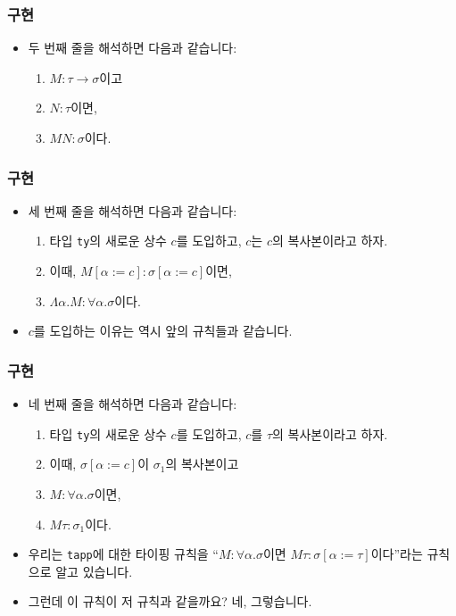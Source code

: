 \documentclass[slidestop,compress,mathserif]{beamer}
\begin{document}
    \begin{frame}
        \frametitle{구현}
        \begin{itemize}
            \item 두 번째 줄을 해석하면 다음과 같습니다:
            \begin{enumerate}
                \item $M : \tau \to \sigma$이고
                \item $N : \tau$이면,
                \item $M N : \sigma$이다.
            \end{enumerate}
        \end{itemize}
    \end{frame}

    \begin{frame}
        \frametitle{구현}
        \begin{itemize}
            \item 세 번째 줄을 해석하면 다음과 같습니다:
            \begin{enumerate}
                \item 타입 \texttt{ty}의 새로운 상수 $c$를 도입하고, $c$는 $c$의 복사본이라고 하자.
                \item 이때, $M \left[ \alpha := c \right] : \sigma \left[ \alpha := c \right]$이면,
                \item $\Lambda \alpha . M : \forall \alpha . \sigma$이다.
            \end{enumerate}
            \item $c$를 도입하는 이유는 역시 앞의 규칙들과 같습니다.
        \end{itemize}
    \end{frame}

    \begin{frame}
        \frametitle{구현}
        \begin{itemize}
            \item 네 번째 줄을 해석하면 다음과 같습니다:
            \begin{enumerate}
                \item 타입 \texttt{ty}의 새로운 상수 $c$를 도입하고, $c$를 $\tau$의 복사본이라고 하자.
                \item 이때, $\sigma \left[ \alpha := c \right]$이 $\sigma_1$의 복사본이고
                \item $M : \forall \alpha . \sigma$이면,
                \item $M \tau : \sigma_1$이다. 
            \end{enumerate}
            \item 우리는 \texttt{tapp}에 대한 타이핑 규칙을 ``$M : \forall \alpha . \sigma$이면 $M \tau : \sigma \left[ \alpha := \tau \right]$이다''라는 규칙으로 알고 있습니다.
            \item 그런데 이 규칙이 저 규칙과 같을까요? 네, 그렇습니다.
        \end{itemize}
    \end{frame}
\end{document}
